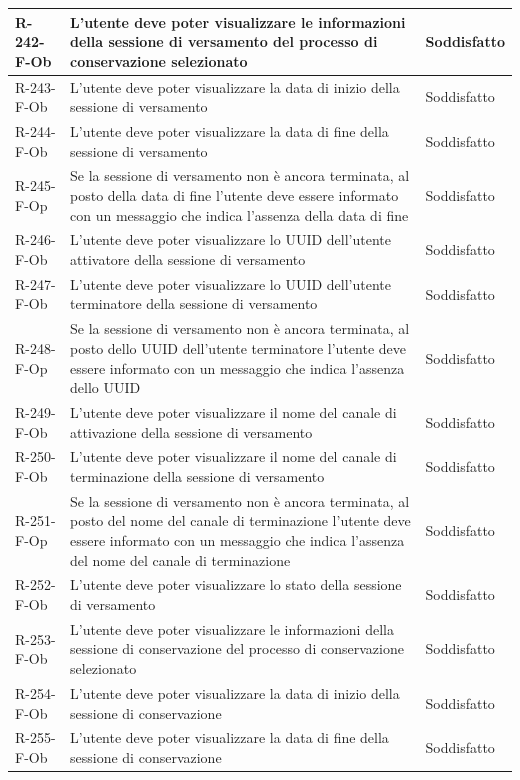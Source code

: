 \begin{longtable}{|p{2.5cm}|p{9.5cm}|p{2.5cm}|}
\hline
R-242-F-Ob & L'utente deve poter visualizzare le informazioni della sessione di versamento del processo di conservazione selezionato & Soddisfatto \\
\hline
R-243-F-Ob & L'utente deve poter visualizzare la data di inizio della sessione di versamento & Soddisfatto \\
\hline
R-244-F-Ob & L'utente deve poter visualizzare la data di fine della sessione di versamento & Soddisfatto \\
\hline
R-245-F-Op & Se la sessione di versamento non è ancora terminata, al posto della data di fine l'utente deve essere informato con un messaggio che indica l'assenza della data di fine & Soddisfatto \\
\hline
R-246-F-Ob & L'utente deve poter visualizzare lo UUID dell'utente attivatore della sessione di versamento & Soddisfatto \\
\hline
R-247-F-Ob & L'utente deve poter visualizzare lo UUID dell'utente terminatore della sessione di versamento & Soddisfatto \\
\hline
R-248-F-Op & Se la sessione di versamento non è ancora terminata, al posto dello UUID dell'utente terminatore l'utente deve essere informato con un messaggio che indica l'assenza dello UUID & Soddisfatto \\
\hline
R-249-F-Ob & L'utente deve poter visualizzare il nome del canale di attivazione della sessione di versamento & Soddisfatto \\
\hline
R-250-F-Ob & L'utente deve poter visualizzare il nome del canale di terminazione della sessione di versamento & Soddisfatto \\
\hline
R-251-F-Op & Se la sessione di versamento non è ancora terminata, al posto del nome del canale di terminazione l'utente deve essere informato con un messaggio che indica l'assenza del nome del canale di terminazione & Soddisfatto \\
\hline
R-252-F-Ob & L'utente deve poter visualizzare lo stato della sessione di versamento & Soddisfatto \\
\hline
R-253-F-Ob & L'utente deve poter visualizzare le informazioni della sessione di conservazione del processo di conservazione selezionato & Soddisfatto \\
\hline
R-254-F-Ob & L'utente deve poter visualizzare la data di inizio della sessione di conservazione & Soddisfatto \\
\hline
R-255-F-Ob & L'utente deve poter visualizzare la data di fine della sessione di conservazione & Soddisfatto \\

\end{longtable}
